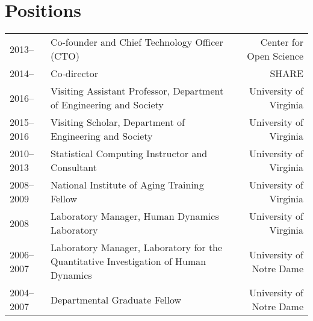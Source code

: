 \documentclass[11pt]{article}
\begin{document}
\maketitle


\section*{Positions}
\begin{tabularx}{\textwidth}{l X r}
2013-- 			& Co-founder and Chief Technology Officer (CTO) & Center for Open Science\\
2014-- 			& Co-director & SHARE \\
2016--				& Visiting Assistant Professor, Department of Engineering and Society & University of Virginia \\
2015--2016		& Visiting Scholar, Department of Engineering and Society & University of Virginia \\
2010--2013 	& Statistical Computing Instructor and Consultant &  University of Virginia\\
2008--2009 	& National Institute of Aging Training Fellow & University of Virginia\\
2008 				& Laboratory Manager, Human Dynamics Laboratory & University of Virginia\\
2006--2007 	& Laboratory Manager, Laboratory for the Quantitative Investigation of Human Dynamics & University of Notre Dame\\
2004--2007 	& Departmental Graduate Fellow & University of Notre Dame\\
\end{tabularx}
\end{document}

